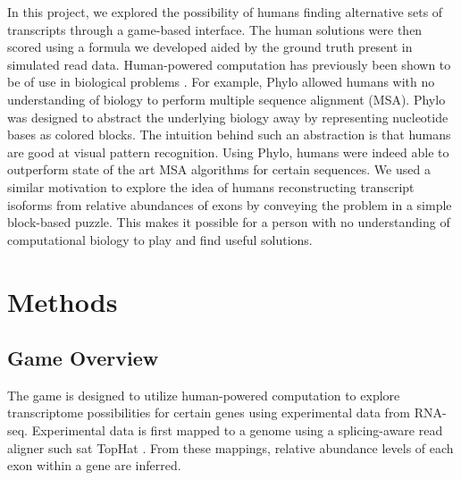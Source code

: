 \documentclass[12pt]{article}
\begin{document}
In this project, we explored the possibility of humans finding alternative sets of transcripts through a game-based interface. The human solutions were then scored using a formula we developed aided by the ground truth present in simulated read data. Human-powered computation has previously been shown to be of use in biological problems \citep{kawrykow2012phylo, cooper2010predicting}. For example, Phylo allowed humans with no understanding of biology to perform multiple sequence alignment (MSA). Phylo was designed to abstract the underlying biology away by representing nucleotide bases as colored blocks.  The intuition behind such an abstraction is that humans are good at visual pattern recognition. Using Phylo, humans were indeed able to outperform state of the art MSA algorithms for certain sequences. We used a similar motivation to explore the idea of humans reconstructing transcript isoforms from relative abundances of exons by conveying the problem in a simple block-based puzzle. This makes it possible for a person with no understanding of computational biology to play and find useful solutions. 

\section*{Methods}

\subsection*{Game Overview}
The game is designed to utilize human-powered computation to explore transcriptome possibilities for certain genes using experimental data from
RNA-seq. Experimental data is first mapped to a genome using a splicing-aware read aligner such sat TopHat \citep{trapnell2009tophat}. From these mappings,
relative abundance levels of each exon within a gene are inferred.
\end{document}
